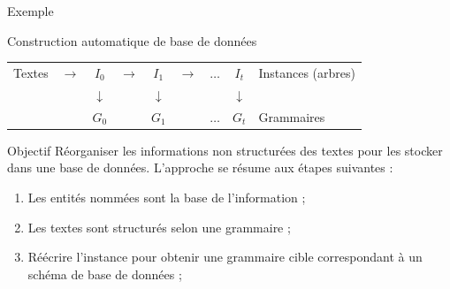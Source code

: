 \begin{frame}{Exemple}
\begin{figure}[htb]
\begin{adjustbox}{max width=\linewidth}
        \end{adjustbox}
    \end{figure}
\end{frame}

\begin{frame}{Construction automatique de base de données}
    \centering
    \begin{adjustbox}{max width=.8\linewidth}
        \begin{tabular}{cccccccc|l}
            Textes & $\rightarrow$ & $I_0$        & $\rightarrow$ & $ I_1$       & $\rightarrow$ & $ \dots$ & $I_t$        & Instances (arbres) \\
                   &               & $\downarrow$ &               & $\downarrow$ &               &          & $\downarrow$ &                    \\
                   &               & $G_0$        &               & $G_1$        &               & $ \dots$ & $G_t$        & Grammaires         \\
        \end{tabular}
    \end{adjustbox}

    \vfill

    \begin{block}{Objectif}
        Réorganiser les informations non structurées des textes pour les stocker dans une base de données.
        L'approche se résume aux étapes suivantes :
        \begin{enumerate}
            \item Les entités nommées sont la base de l'information ;
            \item Les textes sont structurés selon une grammaire ;
            \item Réécrire l'instance pour obtenir une grammaire cible correspondant à un schéma de base de données ;
        \end{enumerate}
    \end{block}
\end{frame}

